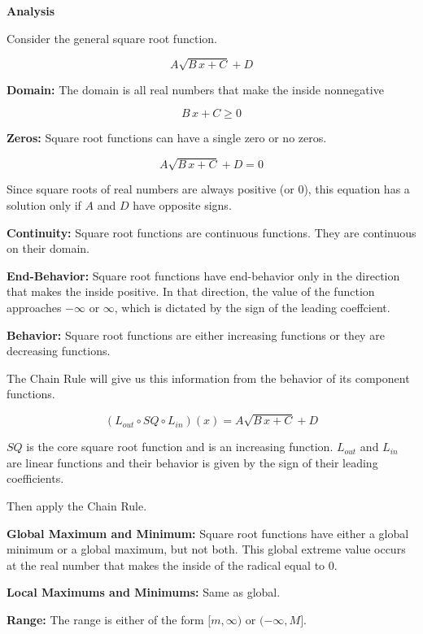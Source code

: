 \documentclass{ximera}
\begin{document}
\begin{summary} \textbf{\textcolor{red!70!yellow}{Analysis}}


Consider the general square root function.

\[  A \sqrt{B \,x + C} + D  \]


\textbf{Domain:} The domain is all real numbers that make the inside nonnegative


\[ B \,x + C \geq 0 \]


\textbf{Zeros:} Square root functions can have a single zero or no zeros.


\[  A \sqrt{B \,x + C} + D  = 0 \]

Since square roots of real numbers are always positive (or $0$), this equation has a solution only if $A$ and $D$ have opposite signs.


\textbf{Continuity:} Square root functions are continuous functions.  They are continuous on their domain.



\textbf{End-Behavior:} Square root functions have end-behavior only in the direction that makes the inside positive. In that direction, the value of the function approaches $-\infty$ or $\infty$, which is dictated by the sign of the leading coeffcient.



\textbf{Behavior:} Square root functions are either increasing functions or they are decreasing functions.  

The Chain Rule will give us this information from the behavior of its component functions.


\[
(L_{out} \circ SQ \circ L_{in})(x) = A \sqrt{B \,x + C} + D
\]


$SQ$ is the core square root function and is an increasing function.  $L_{out}$ and $L_{in}$ are linear functions and their behavior is given by the sign of their leading coefficients.

Then apply the Chain Rule.



\textbf{Global Maximum and Minimum:}  Square root functions have either a global minimum or a global maximum, but not both. This global extreme value occurs at the real number that makes the inside of the radical equal to $0$.


\textbf{Local Maximums and Minimums:} Same as global.


\textbf{Range:} The range is either of the form $[m, \infty)$ or $(-\infty, M]$.

\end{summary}
\end{document}
